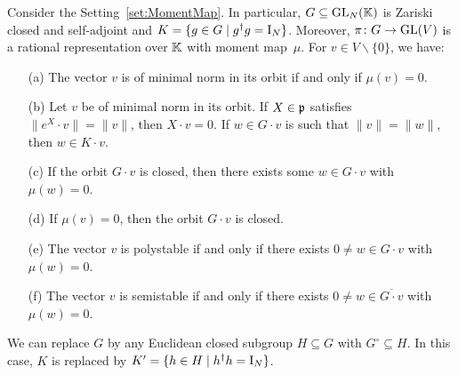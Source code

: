 \begin{theorem} \label{thm:KempfNessAKRS}
	Consider the Setting~\ref{set:MomentMap}. In particular, $G \subseteq \operatorname{GL}_N(\mathbb K)$ is Zariski closed and self-adjoint and $K = \{g \in G \mid g^{\dagger} g = \operatorname{I}_N \}$. Moreover, $\pi \colon G \to \operatorname{GL}(V)$ is a rational representation over $\mathbb K$ with moment map~$\mu$.
	For $v \in V \backslash \{0\}$, we have:
	\begin{itemize} \itemsep 3pt
		\item[(a)] The vector $v$ is of minimal norm in its orbit if and only if $\mu(v)=0$.
		
		\item[(b)] Let $v$ be of minimal norm in its orbit. If $X \in \mathfrak{p}$ satisfies $\| e^X \cdot v \| = \|v\|$, then $X \cdot v = 0$. If $w \in G \cdot v$ is such that $\|v\| = \| w \|$, then $w \in K \cdot v$.
		
		\item[(c)] If the orbit $G \cdot v$ is closed, then there exists some $w \in G \cdot v$ with $\mu(w)=0$.
		
		\item[(d)] If $\mu(v)=0$, then the orbit $G \cdot v$ is closed.
		
		\item[(e)] The vector $v$ is polystable if and only if there exists $0 \neq w \in G \cdot v$ with  $\mu(w)=0$.
		
		\item[(f)] The vector $v$ is semistable if and only if there exists $0 \neq w \in \overline{G \cdot v}$ with $\mu(w)=0$.
	\end{itemize}
	We can replace $G$ by any Euclidean closed subgroup $H \subseteq G$ with $G^\circ \subseteq H$. In this case, $K$ is replaced by $K' = \{ h \in H \mid h^{\dagger} h = \operatorname{I}_N\}$.
\end{theorem}

